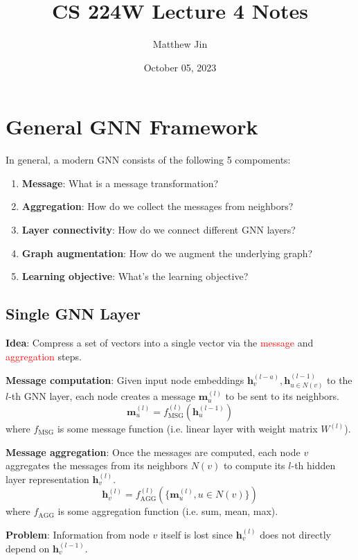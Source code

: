 \documentclass[12pt]{article}
\newcommand{\tbf}{\textbf}
\newcommand{\tcR}{\textcolor{red}}
\newcommand{\mbf}{\mathbf}
\begin{document}
\title{CS 224W Lecture 4 Notes}
\author{Matthew Jin}
\date{October 05, 2023}
\maketitle

\section*{General GNN Framework}

In general, a modern GNN consists of the following 5 compoments:
\begin{enumerate}
  \itemsep0em
  \item \tbf{Message}: What is a message transformation?
  \item \tbf{Aggregation}: How do we collect the messages from neighbors?
  \item \tbf{Layer connectivity}: How do we connect different GNN layers?
  \item \tbf{Graph augmentation}: How do we augment the underlying graph?
  \item \tbf{Learning objective}: What's the learning objective?
\end{enumerate}

\subsection*{Single GNN Layer}

\tbf{Idea}: Compress a set of vectors into a single vector via the \tcR{message}
and \tcR{aggregation} steps.

\medskip
\tbf{Message computation}: Given input node embeddings $\mbf{h}_v^{(l-a)},
\mbf{h}_{u \in N(v)}^{(l-1)}$ to the $l$-th GNN layer, each node creates a
message $\mbf{m}_u^{(l)}$ to be sent to its neighbors.
\[
  \mbf{m}_u^{(l)} = f_{\text{MSG}}^{(l)}(\mbf{h}_u^{(l-1)})
\]
where $f_{\text{MSG}}$ is some message function (i.e. linear layer with weight
matrix $W^{(l)}$).

\medskip
\tbf{Message aggregation}: Once the messages are computed, each node $v$
aggregates the messages from its neighbors $N(v)$ to compute its $l$-th hidden
layer representation $\mbf{h}_v^{(l)}$.
\[
  \mbf{h}_v^{(l)} = f_{\text{AGG}}^{(l)}(\{\mbf{m}_u^{(l)}, u \in N(v)\})
\]
where $f_{\text{AGG}}$ is some aggregation function (i.e. sum, mean, max).

\smallskip
\tbf{Problem}: Information from node $v$ itself is lost since $\mbf{h}_v^{(l)}$
does not directly depend on $\mbf{h}_v^{(l-1)}$.
\end{document}
